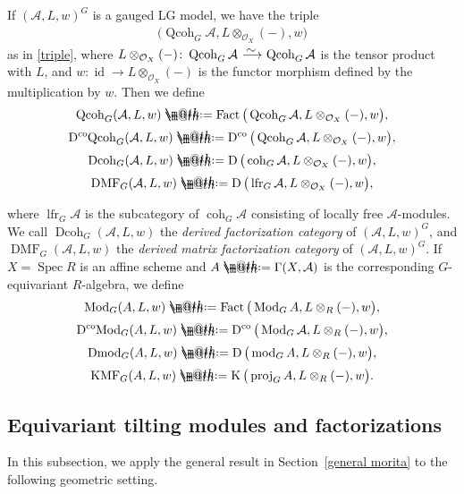 \documentclass[pdftex]{sigma}%
\makeatletter
\newcommand*{\defeq}{\mathrel{\rlap{%
 \raisebox{0.3ex}{$\m@th\cdot$}}%
 \raisebox{-0.3ex}{$\m@th\cdot$}}%
 =}
\numberwithin{equation}{section}
\newcommand{\Fact}{\operatorname{Fact}}
\newcommand{\Dmod}{\operatorname{Dmod}}
\newcommand{\DcoMod}{\operatorname{D^{co}\hspace{-0.1mm}Mod}}
\newcommand{\DMF}{\operatorname{DMF}}
\newcommand{\KMF}{\operatorname{KMF}}
\newcommand{\Dcoh}{\operatorname{Dcoh}}
\newcommand{\DcoQcoh}{\operatorname{D^{co}\hspace{-0.1mm}Qcoh}}
\newcommand{\Spec}{\operatorname{Spec}}
\newcommand{\coh}{\operatorname{coh}}
\newcommand{\Qcoh}{\operatorname{Qcoh}}
\newcommand{\Mod}{\operatorname{Mod}}
\newcommand{\fmod}{\operatorname{mod}}
\newcommand{\lfr}{\operatorname{lfr}}
\newcommand{\proj}{\operatorname{proj}}
\newcommand{\Dco}{\operatorname{D^{co}}}
\newcommand{\D}{\operatorname{D}}
\newcommand{\K}{\operatorname{K}}
\newcommand{\id}{\operatorname{id}}
\newcommand{\cA}{\mathcal{A}}
\newcommand{\cO}{\mathcal{O}}
\newcommand{\simto}{\,\,\,\,\raisebox{4pt}{$\sim$}{\kern -1.1em \longrightarrow}\,}
\makeatother
\begin{document}
If $(\cA,L,w)^G$ is a gauged LG model, we have the triple
\begin{gather*}
\big(\Qcoh_G\cA,L\otimes_{\cO_X}(-),w\big)
\end{gather*}
as in \eqref{triple}, where $L\otimes_{\cO_X}(-)\colon \Qcoh_G\cA\simto \Qcoh_G\cA$ is the tensor product with $L$, and $w\colon\id\to L\otimes_{\cO_X}(-)$ is the functor morphism defined by the multiplication by $w$. Then we define
\begin{gather*}
\Qcoh_G(\cA,L,w)\defeq\Fact\big(\Qcoh_G\cA,L\otimes_{\cO_X}(-),w\big),
\\[.5ex]
\DcoQcoh_G(\cA,L,w)\defeq\Dco\big(\Qcoh_G\cA,L\otimes_{\cO_X}(-),w\big),
\\[.5ex]
\Dcoh_G(\cA,L,w)\defeq\D\big(\coh_G\cA,L\otimes_{\cO_X}(-),w\big),
\\[.5ex]
\DMF_G(\cA,L,w)\defeq\D\big(\lfr_G\cA,L\otimes_{\cO_X}(-),w\big),
\end{gather*}
{\sloppy
where $\lfr_G\cA$ is the subcategory of $\coh_G\cA$ consisting of locally free $\cA$-modules. We call $\Dcoh_G(\cA,L,w)$ the {\it derived factorization category} of $(\cA,L,w)^G$, and $\DMF_G(\cA,L,w)$ the {\it derived matrix factorization category} of $(\cA,L,w)^G$. If $X=\Spec R$ is an affine scheme and $A\defeq\Gamma(X,\cA)$ is the corresponding $G$-equivariant $R$-algebra, we define
\begin{gather*}
\Mod_G(A,L,w)\defeq\Fact\big(\Mod_GA,L\otimes_{R}(-),w\big),
\\[.5ex]
\DcoMod_G(A,L,w)\defeq\Dco\big(\Mod_G\cA,L\otimes_{R}(-),w\big),
\\[.5ex]
\Dmod_G(A,L,w)\defeq\D\big(\fmod_GA,L\otimes_{R}(-),w\big),
\\[.5ex]
\KMF_G(A,L,w)\defeq\K\big(\proj_GA,L\otimes_{R}(-),w\big).
\end{gather*}

}


\subsection{Equivariant tilting modules and factorizations}
In this subsection, we apply the general result in Section~\ref{general morita} to the following geometric setting.
\end{document}
